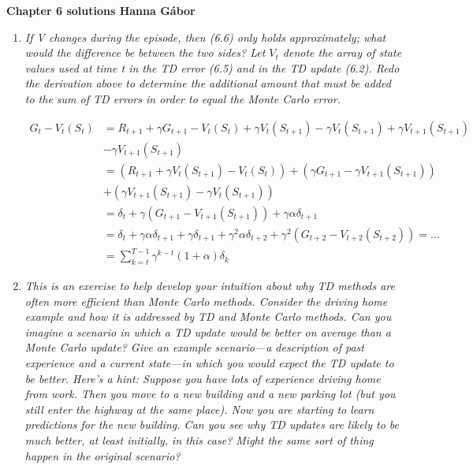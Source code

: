 \documentclass[12pt,a4paper]{article}
\begin{document}
\textbf{Chapter 6 solutions  \hfill Hanna Gábor}\\

\begin{enumerate}
\item
\textit{If V changes during the episode, then (6.6) only holds approximately; what
would the difference be between the two sides? Let $V_t$ denote the array of state values
used at time t in the TD error (6.5) and in the TD update (6.2). Redo the derivation
above to determine the additional amount that must be added to the sum of TD errors
in order to equal the Monte Carlo error.}

\begin{align*}
G_t - V_t(S_t) & = R_{t + 1} + \gamma G_{t + 1} - V_t(S_t) + \gamma V_t(S_{t + 1}) -
\gamma V_t(S_{t + 1}) + \gamma V_{t + 1}(S_{t + 1})\\
& - \gamma V_{t + 1}(S_{t + 1})\\
& = (R_{t + 1} + \gamma V_t(S_{t + 1}) - V_t(S_t)) + (\gamma G_{t + 1} - \gamma V_{t + 1}(S_{t + 1}))\\
& + (\gamma V_{t + 1}(S_{t + 1}) -\gamma V_t(S_{t + 1}))\\
& = \delta_t + \gamma(G_{t + 1} - V_{t + 1}(S_{t + 1})) + \gamma \alpha \delta_{t + 1}\\
& = \delta_t + \gamma \alpha \delta_{t + 1} + \gamma \delta_{t + 1} + \gamma^2 \alpha \delta_{t + 2} + \gamma^2(G_{t + 2} - V_{t + 2}(S_{t + 2})) = \dots\\
& = \sum\limits_{k = t}^{T - 1} \gamma^{k-t}( 1 + \alpha) \delta_{k}
\end{align*}

\item
\textit{This is an exercise to help develop your intuition about why TD methods
are often more efficient than Monte Carlo methods. Consider the driving home example
and how it is addressed by TD and Monte Carlo methods. Can you imagine a scenario
in which a TD update would be better on average than a Monte Carlo update? Give
an example scenario—a description of past experience and a current state—in which
you would expect the TD update to be better. Here’s a hint: Suppose you have lots
of experience driving home from work. Then you move to a new building and a new
parking lot (but you still enter the highway at the same place). Now you are starting
to learn predictions for the new building. Can you see why TD updates are likely to be
much better, at least initially, in this case? Might the same sort of thing happen in the
original scenario?}


\end{enumerate}
\end{document}
